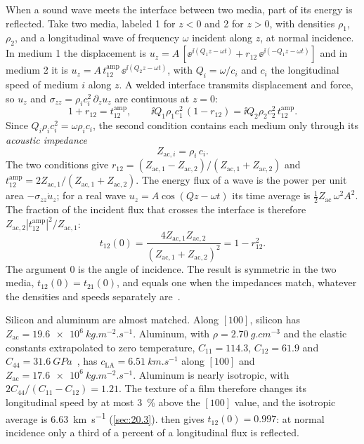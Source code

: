 When a sound wave meets the interface between two media, part of its energy is reflected. Take two media, labeled 1 for $z < 0$ and 2 for $z > 0$, with densities $\rho_1$, $\rho_2$, and a longitudinal wave of frequency $\omega$ incident along $z$, at normal incidence. In medium 1 the displacement is $u_z = A\,[\ee^{\ii(Q_1z - \omega t)} + r_{12}\,\ee^{\ii(-Q_1z - \omega t)}]$ and in medium 2 it is $u_z = A\,t^{\mathrm{amp}}_{12}\,\ee^{\ii(Q_2z - \omega t)}$, with $Q_i = \omega/c_i$ and $c_i$ the longitudinal speed of medium $i$ along $z$. A welded interface transmits displacement and force, so $u_z$ and $\sigma_{zz} = \rho_ic_i^2\,\partial_zu_z$ are continuous at $z = 0$:
\begin{equation*}
  1 + r_{12} = t^{\mathrm{amp}}_{12}, \qquad
  \ii Q_1\rho_1c_1^2\,(1 - r_{12}) = \ii Q_2\rho_2c_2^2\,t^{\mathrm{amp}}_{12} .
\end{equation*}
Since $Q_i\rho_ic_i^2 = \omega\rho_ic_i$, the second condition contains each medium only through its \emph{acoustic impedance}
\begin{equation}
  Z_{\mathrm{ac},i} = \rho_i\,c_i .
  \label{eq:C.18-impedance}
\end{equation}
The two conditions give $r_{12} = (Z_{\mathrm{ac},1} - Z_{\mathrm{ac},2})/(Z_{\mathrm{ac},1} + Z_{\mathrm{ac},2})$ and $t^{\mathrm{amp}}_{12} = 2Z_{\mathrm{ac},1}/(Z_{\mathrm{ac},1} + Z_{\mathrm{ac},2})$. The energy flux of a wave is the power per unit area $-\sigma_{zz}\dot u_z$; for a real wave $u_z = A\cos(Qz - \omega t)$ its time average is $\tfrac12Z_{\mathrm{ac}}\,\omega^2A^2$. The fraction of the incident flux that crosses the interface is therefore $Z_{\mathrm{ac},2}|t^{\mathrm{amp}}_{12}|^2/Z_{\mathrm{ac},1}$:
\begin{equation}
  t_{12}(0) = \frac{4Z_{\mathrm{ac},1}Z_{\mathrm{ac},2}}{(Z_{\mathrm{ac},1} + Z_{\mathrm{ac},2})^2} = 1 - r_{12}^2 .
  \label{eq:C.18-transmission}
\end{equation}
The argument $0$ is the angle of incidence. The result is symmetric in the two media, $t_{12}(0) = t_{21}(0)$, and equals one when the impedances match, whatever the densities and speeds separately are~\cite{swartz1989thermal}.

Silicon and aluminum are almost matched. Along $[100]$, silicon has $Z_{\mathrm{ac}} = \SI{19.6e6}{kg.m^{-2}.s^{-1}}$. Aluminum, with $\rho = \SI{2.70}{g.cm^{-3}}$ and the elastic constants extrapolated to zero temperature, $C_{11} = 114.3$, $C_{12} = 61.9$ and $C_{44} = \SI{31.6}{GPa}$~\cite[Table~2]{malica2020quasi}, has $c_{\mathrm{LA}} = \SI{6.51}{km.s^{-1}}$ along $[100]$ and $Z_{\mathrm{ac}} = \SI{17.6e6}{kg.m^{-2}.s^{-1}}$. Aluminum is nearly isotropic, with $2C_{44}/(C_{11} - C_{12}) = 1.21$. The texture of a film therefore changes its longitudinal speed by at most \SI{3}{\percent} above the $[100]$ value, and the isotropic average is \SI{6.63}{km.s^{-1}} (\cref{sec:20.3}).  then gives $t_{12}(0) = 0.997$: at normal incidence only a third of a percent of a longitudinal flux is reflected.


